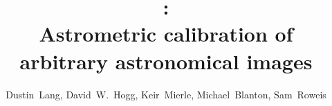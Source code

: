 \documentclass[12pt,preprint]{aastex}
\title{\an: \\
       Astrometric calibration of arbitrary astronomical images}
\author{Dustin~Lang\altaffilmark{1,2,3},
        David~W.~Hogg\altaffilmark{4,5},
        Keir~Mierle\altaffilmark{1,6},
        Michael~Blanton\altaffilmark{4},
        Sam~Roweis\altaffilmark{1,6}
}
\begin{document}
\maketitle



{\small


}
\end{document}
